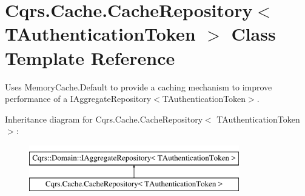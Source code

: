 \hypertarget{classCqrs_1_1Cache_1_1CacheRepository}{}\section{Cqrs.\+Cache.\+Cache\+Repository$<$ T\+Authentication\+Token $>$ Class Template Reference}
\label{classCqrs_1_1Cache_1_1CacheRepository}


Uses Memory\+Cache.\+Default to provide a caching mechanism to improve performance of a I\+Aggregate\+Repository$<$\+T\+Authentication\+Token$>$.  


Inheritance diagram for Cqrs.\+Cache.\+Cache\+Repository$<$ T\+Authentication\+Token $>$\+:\begin{figure}[H]
\begin{center}
\leavevmode
\includegraphics[height=2.000000cm]{classCqrs_1_1Cache_1_1CacheRepository}
\end{center}
\end{figure}
